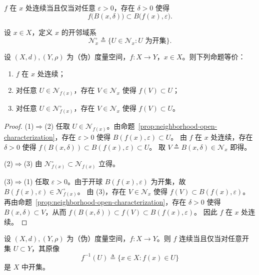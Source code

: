 \documentclass[lang=cn,a4paper,newtx,section]{elegantbook}
\begin{document}
\begin{remark}
  $f$ 在 $x$ 处连续当且仅当对任意 $\varepsilon>0$，存在 $\delta>0$ 使得
  \[
    f\bigl(B(x,\delta)\bigr)\subset B\bigl(f(x),\varepsilon\bigr).
  \]
\end{remark}

\begin{definition}
  设 $x\in X$，定义 $x$ 的开邻域系
  \[
    \mathcal{N}_x^\circ\triangleq \{U\in\mathcal{N}_x: U \text{ 为开集}\}.
  \]
\end{definition}

\begin{proposition}\label{prop:continuity-neighborhood}
  设 $(X,d),(Y,\rho)$ 为（伪）度量空间，$f:X\to Y$，$x\in X$。则下列命题等价：
  \begin{enumerate}
    \item $f$ 在 $x$ 处连续；
    \item 对任意 $U\in\mathcal{N}_{f(x)}$，存在 $V\in\mathcal{N}_x$ 使得 $f(V)\subset U$；
    \item 对任意 $U\in\mathcal{N}_{f(x)}^\circ$，存在 $V\in\mathcal{N}_x$ 使得 $f(V)\subset U$。
  \end{enumerate}
\end{proposition}

\begin{proof}
  (1)$\Rightarrow$(2) 任取 $U\in\mathcal{N}_{f(x)}$。由命题~\ref{prop:neighborhood-open-characterization}，存在 $\varepsilon>0$ 使得 $B(f(x),\varepsilon)\subset U$。
  由 $f$ 在 $x$ 处连续，存在 $\delta>0$ 使得 $f(B(x,\delta))\subset B(f(x),\varepsilon)\subset U$。
  取 $V\triangleq B(x,\delta)\in\mathcal{N}_x$ 即得。

  (2)$\Rightarrow$(3) 由 $\mathcal{N}_{f(x)}^\circ\subset\mathcal{N}_{f(x)}$ 立得。

  (3)$\Rightarrow$(1) 任取 $\varepsilon>0$。由于开球 $B(f(x),\varepsilon)$ 为开集，故 $B(f(x),\varepsilon)\in\mathcal{N}_{f(x)}^\circ$。
  由 (3)，存在 $V\in\mathcal{N}_x$ 使得 $f(V)\subset B(f(x),\varepsilon)$。
  再由命题~\ref{prop:neighborhood-open-characterization}，存在 $\delta>0$ 使得 $B(x,\delta)\subset V$，从而 $f(B(x,\delta))\subset f(V)\subset B(f(x),\varepsilon)$。
  因此 $f$ 在 $x$ 处连续。
\end{proof}

\begin{proposition}\label{prop:continuity-open-preimage}
  设 $(X,d),(Y,\rho)$ 为（伪）度量空间，$f:X\to Y$。则 $f$ 连续当且仅当对任意开集 $U\subset Y$，其原像
  \[
    f^{-1}(U)\triangleq \{x\in X: f(x)\in U\}
  \]
  是 $X$ 中开集。
\end{proposition}
\end{document}
